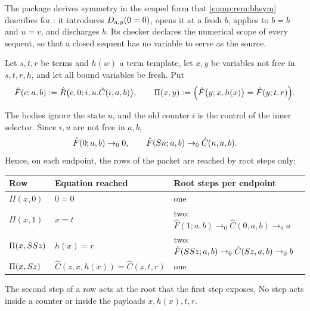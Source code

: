 The package  derives symmetry in the scoped form that \cref{comp:rem:bhsym}
describes for : it introduces $D_{a,y}(0=0)$, opens it at a fresh
$b$, applies  to $b=b$ and $u=v$, and discharges $b$. Its checker declares
the numerical scope of every sequent, so that a closed sequent has no variable to serve as
the source.

\begin{definition}\label{ctr:def:rootpacket}
Let $s,t,r$ be terms and $h(w)$ a term template, let $x,y$ be variables not free in $s,t,r,h$,
and let all bound variables be fresh. Put
\[
 \hat F(c;a,b)\mathrel{:=}\hat R\bigl(c,0;i,u.\hat C(i,a,b)\bigr),\qquad
 \Pi(x,y)\mathrel{:=}\Bigl(\hat F\bigl(y;x,h(x)\bigr)=\hat F(y;t,r)\Bigr).
\]
\end{definition}

The bodies ignore the state $u$, and the old counter $i$ is the control of the inner
selector. Since $i,u$ are not free in $a,b$,
\[
 \hat F(0;a,b)\to_0 0,\qquad \hat F(S n;a,b)\to_0\hat C(n,a,b).
\]
Hence, on each endpoint, the rows of the packet are reached by root steps only:
\begin{center}
\begin{tabular}{@{}lll@{}}
\toprule
Row & Equation reached & Root steps per endpoint\\
\midrule
$\Pi(x,0)$ & $0=0$ & one\\
$\Pi(x,1)$ & $x=t$ & two: $\hat F(1;a,b)\to_0\hat C(0,a,b)\to_0 a$\\
$\Pi(x,SS z)$ & $h(x)=r$ & two: $\hat F(SS z;a,b)\to_0\hat C(S z,a,b)\to_0 b$\\
$\Pi(x,S z)$ & $\hat C(z,x,h(x))=\hat C(z,t,r)$ & one\\
\bottomrule
\end{tabular}
\end{center}
The second step of a row acts at the root that the first step exposes. No step acts inside a
counter or inside the payloads $x,h(x),t,r$.

